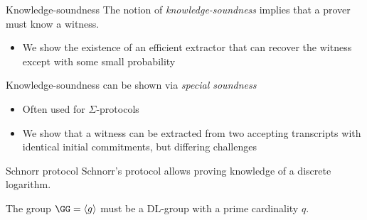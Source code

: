 \begin{frame}{Knowledge-soundness}
  The notion of \emph{knowledge-soundness} implies that a prover must know a witness.
  \begin{itemize}[<+(1)->]
    \item We show the existence of an efficient extractor that can recover the witness except with some small probability
  \end{itemize}

  \vspace*{1em}

  \pause
  Knowledge-soundness can be shown via \emph{special soundness}
  \begin{itemize}[<+(1)->]
    \item Often used for $\Sigma$-protocols
    \item We show that a witness can be extracted from two accepting transcripts with identical initial commitments, but differing challenges
  \end{itemize}
\end{frame}

\begin{frame}{Schnorr protocol}
  Schnorr's protocol allows proving knowledge of a discrete logarithm.
  \pause
  \begin{center}
  \end{center}

  The group $\GG = \langle g\rangle$ must be a DL-group with a prime cardinality $q$.
\end{frame}

